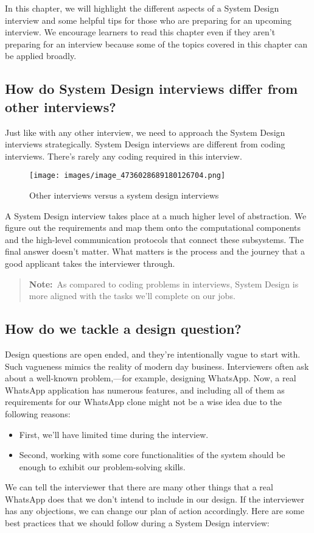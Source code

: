 In this chapter, we will highlight the different aspects of a System Design interview and some helpful tips for those who are preparing for an upcoming interview. 
We encourage learners to read this chapter even if they aren't preparing for an interview because some of the topics covered in this chapter can be applied broadly. \subsection{How do System Design interviews differ from other interviews?}\label{NQeNxrqfHqs-dvlwL9oyU} Just like with any other interview, we need to approach the System Design interviews strategically. 
System Design interviews are different from coding interviews. 
There's rarely any coding required in this interview.

\begin{figure}[htbp]
    \centering
    \texttt{[image: images/image\_4736028689180126704.png]}
    \caption{Other interviews versus a system design interviews}
\end{figure}

A System Design interview takes place at a much higher level of abstraction. 
We figure out the requirements and map them onto the computational components and the high-level communication protocols that connect these subsystems. 
The final answer doesn't matter. 
What matters is the process and the journey that a good applicant takes the interviewer through. \begin{quote} \textbf{Note:}~As compared to coding problems in interviews, System Design is more aligned with the tasks we'll complete on our jobs. \end{quote} \subsection{How do we tackle a design question?}\label{V2_cowfLOR7_6lrU-55Oc} Design questions are open ended, and they're intentionally vague to start with. 
Such vagueness mimics the reality of modern day business. 
Interviewers often ask about a well-known problem,---for example, designing WhatsApp. 
Now, a real WhatsApp application has numerous features, and including all of them as requirements for our WhatsApp clone might not be a wise idea due to the following reasons: \begin{itemize} \item {}\label{0uEfb-y7Eteyhlt2HMQKn} First, we'll have limited time during the interview. \item {}\label{TGDVjaDwtQ0YTnO7z7MNh} Second, working with some core functionalities of the system should be enough to exhibit our problem-solving skills. \end{itemize} We can tell the interviewer that there are many other things that a real WhatsApp does that we don't intend to include in our design. 
If the interviewer has any objections, we can change our plan of action accordingly. 
Here are some best practices that we should follow during a System Design interview:

